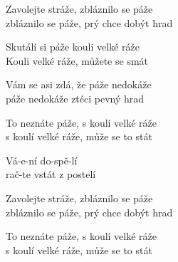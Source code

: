 
\ve{}
Zavolejte stráže, zbláznilo se páže\\
zbláznilo se páže, prý chce dobýt hrad

\ve{}
Skutálí si páže kouli velké ráže\\
Kouli velké ráže, můžete se smát

\ve{}
Vám se asi zdá, že páže nedokáže\\
páže nedokáže ztéci pevný hrad

\ve{}
To neznáte páže, s koulí velké ráže\\
s koulí velké ráže, může se to stát

\cho{}
Vá-e-ní do-spě-lí\\
rač-te vstát z postelí

\ve{}
Zavolejte stráže, zbláznilo se páže\\
zbláznilo se páže, prý chce dobýt hrad

\ve{}
To neznáte páže, s koulí velké ráže\\
s koulí velké ráže, může se to stát

\esong{}